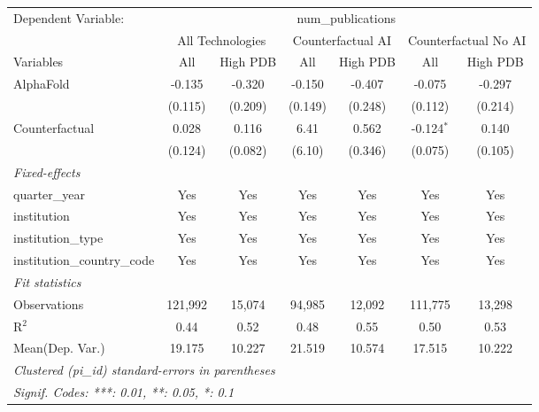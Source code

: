 \begingroup
\centering
\begin{tabular}{lcccccc}
   \tabularnewline \midrule \midrule
   Dependent Variable: & \multicolumn{6}{c}{num\_publications}\\
 & \multicolumn{2}{c}{All Technologies} & \multicolumn{2}{c}{Counterfactual AI} & \multicolumn{2}{c}{Counterfactual No AI} \\
\cmidrule(lr){1-1}\cmidrule(lr){2-3} \cmidrule(lr){4-5} \cmidrule(lr){6-7}
Variables & \multicolumn{1}{c}{All} & \multicolumn{1}{c}{High PDB} & \multicolumn{1}{c}{All} & \multicolumn{1}{c}{High PDB} & \multicolumn{1}{c}{All} & \multicolumn{1}{c}{High PDB} \\
\cmidrule(lr){1-1}\cmidrule(lr){2-2} \cmidrule(lr){3-3} \cmidrule(lr){4-4} \cmidrule(lr){5-5} \cmidrule(lr){6-6} \cmidrule(lr){7-7}
   AlphaFold                    & -0.135  & -0.320  & -0.150  & -0.407  & -0.075       & -0.297\\   
                                & (0.115) & (0.209) & (0.149) & (0.248) & (0.112)      & (0.214)\\   
   Counterfactual               & 0.028   & 0.116   & 6.41    & 0.562   & -0.124$^{*}$ & 0.140\\   
                                & (0.124) & (0.082) & (6.10)  & (0.346) & (0.075)      & (0.105)\\   
   \midrule
   \emph{Fixed-effects}\\
   quarter\_year                & Yes     & Yes     & Yes     & Yes     & Yes          & Yes\\  
   institution                  & Yes     & Yes     & Yes     & Yes     & Yes          & Yes\\  
   institution\_type            & Yes     & Yes     & Yes     & Yes     & Yes          & Yes\\  
   institution\_country\_code   & Yes     & Yes     & Yes     & Yes     & Yes          & Yes\\  
   \midrule
   \emph{Fit statistics}\\
   Observations                 & 121,992 & 15,074  & 94,985  & 12,092  & 111,775      & 13,298\\  
   R$^2$                        & 0.44    & 0.52    & 0.48    & 0.55    & 0.50         & 0.53\\  
Mean(Dep. Var.) & 19.175 & 10.227 & 21.519 & 10.574 & 17.515 & 10.222 \\
   \midrule \midrule
   \multicolumn{7}{l}{\emph{Clustered (pi\_id) standard-errors in parentheses}}\\
   \multicolumn{7}{l}{\emph{Signif. Codes: ***: 0.01, **: 0.05, *: 0.1}}\\
\end{tabular}
\par\endgroup
